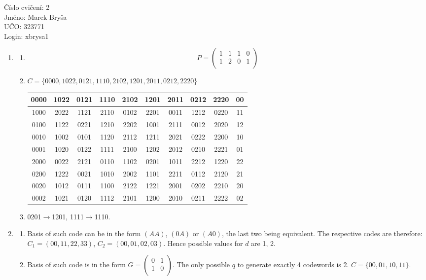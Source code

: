 \documentclass[a4paper,10pt]{article}
\begin{document}
\begin{flushleft}
Číslo cvičení: 2 \\ 
Jméno: Marek Bryša \\
UČO: 323771\\
Login: xbrysa1\\
\end{flushleft}
\begin{enumerate}
  \item
    \begin{enumerate}
      \item
        \[
          P=\begin{pmatrix}
            1 & 1 & 1 & 0 \\
            1 & 2 & 0 & 1 \\
          \end{pmatrix}
        \]
      \item
        $C=\{0000,1022,0121,1110,2102,1201,2011,0212,2220\}$
        \begin{center}
          \begin{tabular}{|c|c|c|c|c|c|c|c|c||c|}
            \hline
            0000	&1022	&0121	&1110	&2102	&1201	&2011	&0212	&2220	&00\\
            \hline
            1000	&2022	&1121	&2110	&0102	&2201	&0011	&1212	&0220	&11\\
            0100	&1122	&0221	&1210	&2202	&1001	&2111	&0012	&2020	&12\\
            0010	&1002	&0101	&1120	&2112	&1211	&2021	&0222	&2200	&10\\
            0001	&1020	&0122	&1111	&2100	&1202	&2012	&0210	&2221	&01\\
            2000	&0022	&2121	&0110	&1102	&0201	&1011	&2212	&1220	&22\\
            0200	&1222	&0021	&1010	&2002	&1101	&2211	&0112	&2120	&21\\
            0020	&1012	&0111	&1100	&2122	&1221	&2001	&0202	&2210	&20\\
            0002	&1021	&0120	&1112	&2101	&1200	&2010	&0211	&2222	&02\\
            \hline
          \end{tabular}
        \end{center}
      \item
        0201$\rightarrow$1201, 1111$\rightarrow$1110.

    \end{enumerate}
  \item
    \begin{enumerate}
      \item
        Basis of such code can be in the form $(AA)$, $(0A)$ or $(A0)$, the last two being equivalent. The respective codes are therefore: $C_1=(00,11,22,33)$, $C_2=(00,01,02,03)$. Hence possible values for $d$ are 1, 2.
      \item
        Basis of such code is in the form $G=\begin{pmatrix}
            0 & 1 \\
            1 & 0 \\
          \end{pmatrix}$. The only possible $q$ to generate exactly 4 codewords is 2. $C=\{00,01,10,11\}$.


\end{enumerate}
\end{enumerate}
\end{document}
